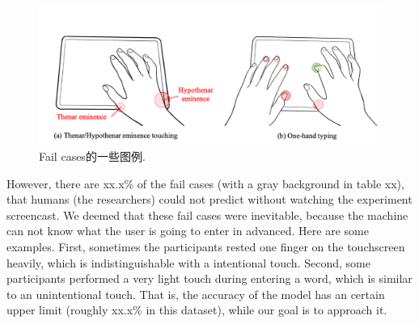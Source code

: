 \begin{figure}[!tbh]
	\includegraphics[width=1.0\linewidth]{figures/fail_case_examples.png}
	\centering
	\caption{Fail cases的一些图例.}
	\label{fig:fail_case_examples}
\end{figure}


However, there are xx.x\% of the fail cases (with a gray background in table xx), that humans (the researchers) could not predict without watching the experiment screencast. We deemed that these fail cases were inevitable, because the machine can not know what the user is going to enter in advanced. Here are some examples. First, sometimes the participants rested one finger on the touchscreen heavily, which is indistinguishable with a intentional touch. Second, some participants performed a very light touch during entering a word, which is similar to an unintentional touch. That is, the accuracy of the model has an certain upper limit (roughly xx.x\% in this dataset), while our goal is to approach it.


